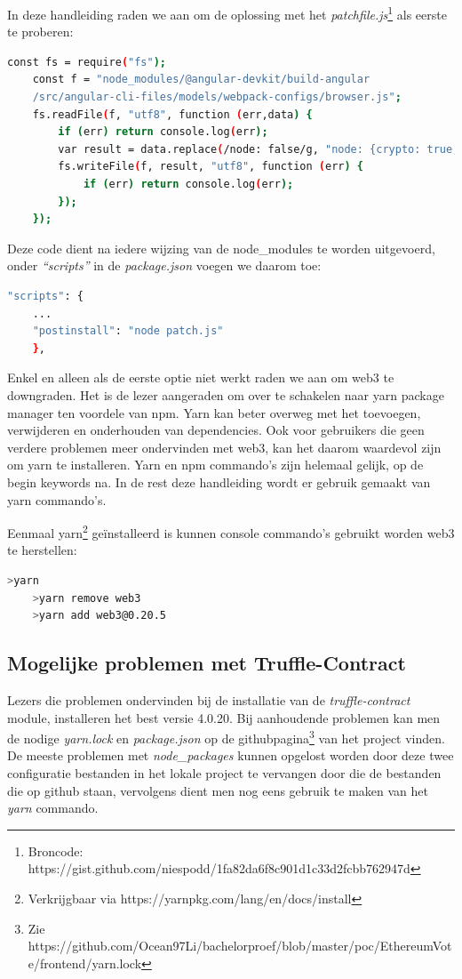 	In deze handleiding raden we aan om de oplossing met het \textit{patchfile.js}\footnote{Broncode: https://gist.github.com/niespodd/1fa82da6f8c901d1c33d2fcbb762947d} als eerste te proberen:
	\begin{lstlisting}[numbers=none,language=bash]
	const fs = require("fs");
	const f = "node_modules/@angular-devkit/build-angular
	/src/angular-cli-files/models/webpack-configs/browser.js";
	fs.readFile(f, "utf8", function (err,data) {
		if (err) return console.log(err);
		var result = data.replace(/node: false/g, "node: {crypto: true, stream: true}");
		fs.writeFile(f, result, "utf8", function (err) {
			if (err) return console.log(err);
		});
	});
	\end{lstlisting}
	Deze code dient na iedere wijzing van de node\_modules te worden uitgevoerd, onder \textit{``scripts''} in de \textit{package.json} voegen we daarom toe:
	\begin{lstlisting}[numbers=none,language=bash]
	"scripts": {
	...
	"postinstall": "node patch.js"
	},
	\end{lstlisting}
	
	Enkel en alleen als de eerste optie niet werkt raden we aan om web3 te downgraden. Het is de lezer aangeraden om over te schakelen naar yarn package manager ten voordele van npm. Yarn kan beter overweg met het toevoegen, verwijderen en onderhouden van dependencies. Ook voor gebruikers die geen verdere problemen meer ondervinden met web3, kan het daarom waardevol zijn om yarn te installeren. Yarn en npm commando's zijn helemaal gelijk, op de begin keywords na. In de rest deze handleiding wordt er gebruik gemaakt van yarn commando's.
	
	Eenmaal yarn\footnote{Verkrijgbaar via https://yarnpkg.com/lang/en/docs/install} geïnstalleerd is kunnen console commando's gebruikt worden web3 te herstellen:
	\begin{lstlisting}[numbers=none,language=bash]
	>yarn
	>yarn remove web3
	>yarn add web3@0.20.5
	\end{lstlisting}

	\subsection{Mogelijke problemen met Truffle-Contract}
	Lezers die problemen ondervinden bij de  installatie van de \textit{truffle-contract} module, installeren het best versie 4.0.20. Bij aanhoudende problemen kan men de nodige \textit{yarn.lock }en \textit{package.json} op de githubpagina\footnote{Zie https://github.com/Ocean97Li/bachelorproef/blob/master/poc/EthereumVote/frontend/yarn.lock} van het project vinden. De meeste problemen met \textit{node\_packages} kunnen opgelost worden door deze twee configuratie bestanden in het lokale project te vervangen door die de bestanden die op github staan, vervolgens dient men nog eens gebruik te maken van het \textit{yarn} commando.
	
